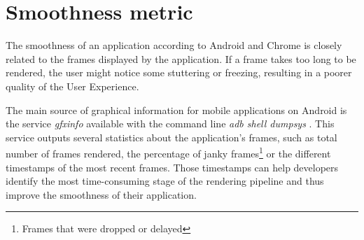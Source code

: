 \documentclass{kththesis}
\begin{document}





\section{Smoothness metric}
\label{method:smoothness}
    
    The smoothness of an application according to Android and Chrome is closely related to the frames displayed by the application. If a frame takes too long to be rendered, the user might notice some stuttering or freezing, resulting in a poorer quality of the User Experience. 
    

    
        
    The main source of graphical information for mobile applications on Android is the service \textit{gfxinfo} available with the command line \textit{adb shell dumpsys} \cite{adb} \cite{dumpsys}. This service outputs several statistics about the application's frames, such as total number of frames rendered, the percentage of janky frames\footnote{Frames that were dropped or delayed} or the different timestamps of the most recent frames. Those timestamps can help developers identify the most time-consuming stage of the rendering pipeline and thus improve the smoothness of their application.
    
\end{document}
